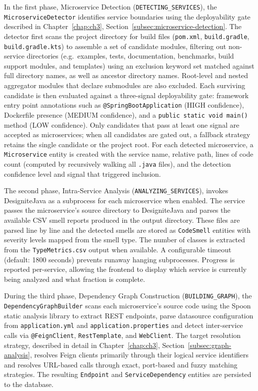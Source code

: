In the first phase, Microservice Detection (\texttt{DETECTING\_SERVICES}), the \texttt{MicroserviceDetector} identifies service boundaries using the deployability gate described in Chapter~\ref{chap:ch3}, Section~\ref{subsec:microservice-detection}. The detector first scans the project directory for build files (\texttt{pom.xml}, \texttt{build.gradle}, \texttt{build.gradle.kts}) to assemble a set of candidate modules, filtering out non-service directories (e.g.\ examples, tests, documentation, benchmarks, build support modules, and templates) using an exclusion keyword set matched against full directory names, as well as ancestor directory names. Root-level and nested aggregator modules that declare submodules are also excluded. Each surviving candidate is then evaluated against a three-signal deployability gate: framework entry point annotations such as \texttt{@SpringBootApplication} (HIGH confidence), Dockerfile presence (MEDIUM confidence), and a \texttt{public static void main()} method (LOW confidence). Only candidates that pass at least one signal are accepted as microservices; when all candidates are gated out, a fallback strategy retains the single candidate or the project root. For each detected microservice, a \texttt{Microservice} entity is created with the service name, relative path, lines of code count (computed by recursively walking all \texttt{.java} files), and the detection confidence level and signal that triggered inclusion.

The second phase, Intra-Service Analysis (\texttt{ANALYZING\_SERVICES}), invokes DesigniteJava as a subprocess for each microservice when enabled. The service passes the microservice's source directory to DesigniteJava and parses the available CSV smell reports produced in the output directory.
These files are parsed line by line and the detected smells are stored as \texttt{CodeSmell} entities with severity levels mapped from the smell type. The number of classes is extracted from the \texttt{TypeMetrics.csv} output when available. A configurable timeout (default: 1800 seconds) prevents runaway hanging subprocesses. Progress is reported per-service, allowing the frontend to display which service is currently being analyzed and what fraction is complete.

During the third phase, Dependency Graph Construction (\texttt{BUILDING\_GRAPH}), the \texttt{DependencyGraphBuilder} scans each microservice's source code using the Spoon static analysis library \cite{Pawlak2016} to extract REST endpoints, parse datasource configuration from \texttt{application.yml} and \texttt{application.properties} and detect inter-service calls via \texttt{@FeignClient}, \texttt{RestTemplate}, and \texttt{WebClient}. The target resolution strategy, described in detail in Chapter~\ref{chap:ch3}, Section~\ref{subsec:graph-analysis}, resolves Feign clients primarily through their logical service identifiers and resolves URL-based calls through exact, port-based and fuzzy matching strategies. The resulting \texttt{Endpoint} and \texttt{Ser\-viceDe\-pen\-den\-cy} entities are persisted to the database.

